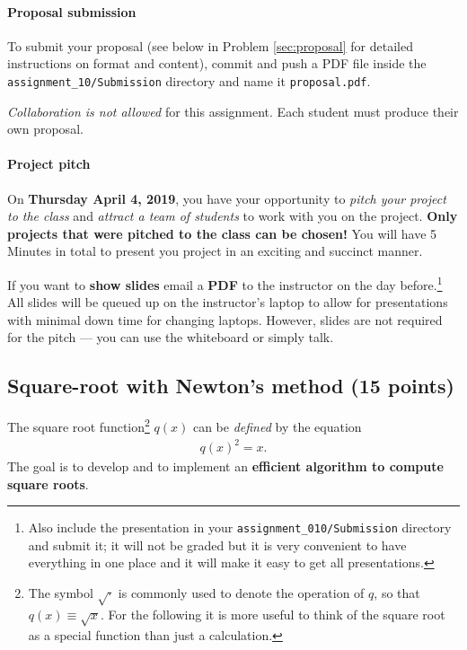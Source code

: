 \documentclass[letterpaper]{scrartcl}
\newcommand{\anumber}{10}
\newcommand{\anum}{\anumber}
\begin{document}
\paragraph{Proposal submission}

To submit your proposal (see below in Problem \ref{sec:proposal} for
detailed instructions on format and content), commit and push a PDF
file inside the \texttt{assignment\_\anum{}/Submission} directory
and name it \texttt{proposal.pdf}.

\emph{Collaboration is not allowed} for this assignment. Each student
must produce their own proposal.


\paragraph{Project pitch}

On \textbf{Thursday April 4, 2019}, you have your opportunity to
\emph{pitch your project to the class} and \emph{attract a team of
  students} to work with you on the project. \textbf{Only projects
  that were pitched to the class can be chosen!} You will have 5
Minutes in total to present you project in an exciting and succinct
manner.

If you want to \textbf{show slides} email a \textbf{PDF} to the
instructor on the day before.\footnote{Also include the presentation
  in your \texttt{assignment\_0\anumber{}/Submission} directory and
  submit it; it will not be graded but it is very convenient to have
  everything in one place and it will make it easy to get all
  presentations.} All slides will be queued up on the instructor's
laptop to allow for presentations with minimal down time for changing
laptops. However, slides are not required for the pitch --- you can
use the whiteboard or simply talk.


\subsection{Square-root with Newton's method (15 points)}
\label{sec:sqrt}

The square root function\footnote{The symbol $\sqrt{\cdot}$ is
  commonly used to denote the operation of $q$, so that
  $q(x) \equiv \sqrt{x}$. For the following it is more useful to think
  of the square root as a special function than just a calculation.}
$q(x)$ can be \emph{defined} by the equation
\begin{gather}
  \label{eq:sqrtdef}
  q(x)^{2} = x.
\end{gather}
The goal is to develop and to implement an \textbf{efficient algorithm
to compute square roots}.
\end{document}
